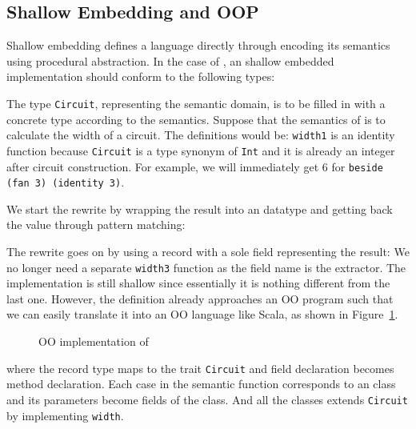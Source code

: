 \subsection{Shallow Embedding and OOP}
Shallow embedding defines a language directly through encoding its semantics
using procedural abstraction. In the case of \dsl,
an shallow embedded implementation should conform to the following types:

The type \lstinline{Circuit}, representing the semantic domain, is to be filled in with a concrete type according to the semantics.
Suppose that the semantics of \dsl is to calculate the width of a
circuit. The definitions would be:
\lstinline{width1} is an identity function because \lstinline{Circuit} is a type
synonym of \lstinline{Int} and it is already an integer after circuit construction.
For example, we will immediately get $6$ for \lstinline{beside (fan 3) (identity 3)}.

We start the rewrite by wrapping the result into an
datatype and getting back the value through pattern matching:

The rewrite goes on by using a record with a sole field representing the result:
We no longer need a separate \lstinline{width3} function as the field name is the extractor.
The implementation is still shallow since essentially it is nothing different
from the last one.
However, the definition already approaches an OO program such that we can easily
translate it into an OO language like Scala, as shown in Figure~\ref{code:base}.

\begin{figure}
\caption{OO implementation of \dsl}
\label{code:base}
\end{figure}
where the record type maps to the trait \lstinline{Circuit} and field
declaration becomes method declaration.
Each case in the semantic function corresponds to an class and its parameters become fields of the class.
And all the classes extends \lstinline{Circuit} by implementing \lstinline{width}.


